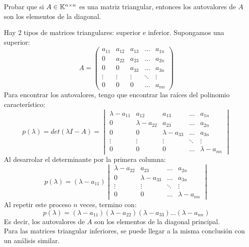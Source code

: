 \item Probar que si $A\in\mathbb{K}^{n\times n}$ es una matriz triangular, entonces los autovalores de $A$ son los elementos de la diagonal.
    \begin{mdframed}[style=s]
        Hay 2 tipos de matrices triangulares: superior e inferior. Supongamos una superior:
        \[A=\begin{pmatrix}
            a_{11}&a_{12}&a_{13}&\dots &a_{1n}\\
            0     &a_{22}&a_{23}&\dots &a_{2n}\\
            0     &0     &a_{33}&\dots &a_{3n}\\
            \vdots&\vdots&\vdots&\ddots&\vdots\\
            0     &0     &0     &\dots &a_{nn}
        \end{pmatrix}\]
        Para encontrar los autovalores, tengo que encontrar las raíces del polinomio característico:
        \[p(\lambda)=det(\lambda I-A)=\begin{vmatrix}
            \lambda-a_{11}&a_{12}        &a_{13}        &\dots &a_{1n}\\
            0             &\lambda-a_{22}&a_{23}        &\dots &a_{2n}\\
            0             &0             &\lambda-a_{33}&\dots &a_{3n}\\
            \vdots        &\vdots        &\vdots        &\ddots&\vdots\\
            0             &0             &0             &\dots &\lambda-a_{nn}
        \end{vmatrix}\]
        Al desarrolar el determinante por la primera columna:
        \[p(\lambda)=(\lambda-a_{11})\begin{vmatrix}
            \lambda-a_{22}&a_{23}        &\dots &a_{2n}\\
            0             &\lambda-a_{33}&\dots &a_{3n}\\
            \vdots        &\vdots        &\ddots&\vdots\\
            0             &0             &\dots &\lambda-a_{nn}
        \end{vmatrix}\]
        Al repetir este proceso $n$ veces, termino con:
        \[p(\lambda)=(\lambda-a_{11})(\lambda-a_{22})(\lambda-a_{33})\dots(\lambda-a_{nn})\]
        Es decir, los autovalores de $A$ son los elementos de la diagonal principal.\\
        Para las matrices triangular inferiores, se puede llegar a la misma conclusión con un análisis similar.
    \end{mdframed}